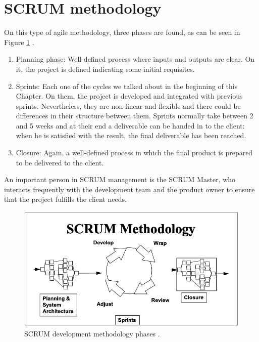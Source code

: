 \section{SCRUM methodology}
On this type of agile methodology, three phases are found, as can be seen in Figure \ref{fig:scrum-phases} \cite{schwaber1997scrum}.
\begin{enumerate}
    \item Planning phase: Well-defined process where inputs and outputs are clear. On it, the project is defined indicating some initial requisites.
    \item Sprints: Each one of the cycles we talked about in the beginning of this Chapter. On them, the project is developed and integrated with previous sprints. Nevertheless, they are non-linear and flexible and there could be differences in their structure between them. Sprints normally take between 2 and 5 weeks and at their end a deliverable can be handed in to the client: when he is satisfied with the result, the final deliverable has been reached.
    \item Closure: Again, a well-defined process in which the final product is prepared to be delivered to the client.
\end{enumerate}
An important person in SCRUM management is the SCRUM Master, who interacts frequently with the development team and the product owner to ensure that the project fulfills the client needs.

\begin{figure}[H]
\centering
    \caption{SCRUM development methodology phases \cite{schwaber1997scrum}.}
    \label{fig:scrum-phases}
    \includegraphics[scale=0.4]{images/planning/scrum_phases}
\end{figure}

